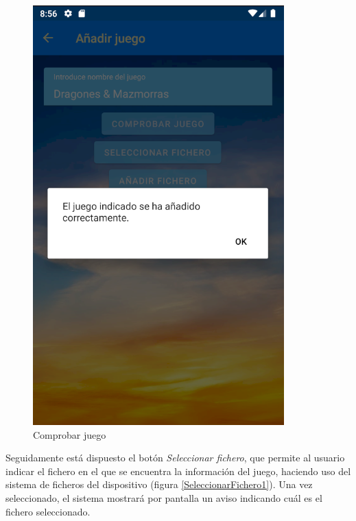 \begin{figure}[H]
    \centering
    \includegraphics[scale=0.7]{Figures/Capturas/ComprobarJuego.png}
    \caption{Comprobar juego}
    \label{ComprobarJuego}    
\end{figure}

Seguidamente está dispuesto el botón \textit{Seleccionar fichero}, que permite al usuario indicar el fichero en el que se 
encuentra la información del juego, haciendo uso del sistema de ficheros del dispositivo (figura \ref*{SeleccionarFichero1}). 
Una vez seleccionado, el sistema mostrará por pantalla un aviso indicando cuál es el fichero seleccionado.

